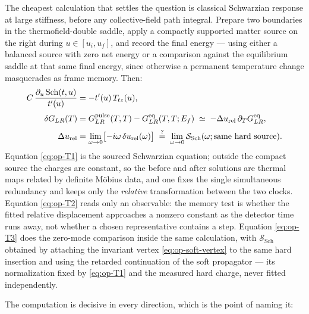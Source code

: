 The cheapest calculation that settles the question is classical Schwarzian
response at large stiffness, before any collective-field path integral. Prepare
two boundaries in the thermofield-double saddle, apply a compactly supported
matter source on the right during $u\in[u_i,u_f]$, and record the final energy
--- using either a balanced source with zero net energy or a comparison against
the equilibrium saddle at that same final energy, since otherwise a permanent
temperature change masquerades as frame memory. Then:
\begin{align}
  C\,\frac{\partial_u\operatorname{Sch}(t,u)}{t'(u)}
    &=-t'(u)\,T_{tz}(u),
    \label{eq:op-T1}\\[2pt]
  \delta G_{LR}(T)
    &=G^{\mathrm{pulse}}_{LR}(T,T)-G^{\mathrm{eq}}_{LR}(T,T;E_f)
     \;\simeq\;-\Delta u_{\mathrm{rel}}\,\partial_T G^{\mathrm{eq}}_{LR},
    \label{eq:op-T2}\\[2pt]
  \Delta u_{\mathrm{rel}}
    &=\lim_{\omega\to0}\bigl[-i\omega\,\delta u_{\mathrm{rel}}(\omega)\bigr]
     \;\overset{?}{=}\;
     \lim_{\omega\to0}\mathcal{S}_{\mathrm{Sch}}
       (\omega;\text{same hard source}).
    \label{eq:op-T3}
\end{align}
Equation \eqref{eq:op-T1} is the sourced Schwarzian equation; outside the
compact source the charges are constant, so the before and after solutions are
thermal maps related by definite M\"obius data, and one fixes the single
simultaneous redundancy and keeps only the \emph{relative} transformation
between the two clocks. Equation \eqref{eq:op-T2} reads only an observable: the
memory test is whether the fitted relative displacement approaches a nonzero
constant as the detector time runs away, not whether a chosen representative
contains a step. Equation \eqref{eq:op-T3} does the zero-mode comparison inside
the same calculation, with $\mathcal{S}_{\mathrm{Sch}}$ obtained by attaching
the invariant vertex \eqref{eq:op-soft-vertex} to the same hard insertion and
using the retarded continuation of the soft propagator --- its normalization
fixed by \eqref{eq:op-T1} and the measured hard charge, never fitted
independently.

The computation is decisive in every direction, which is the point of naming
it:

